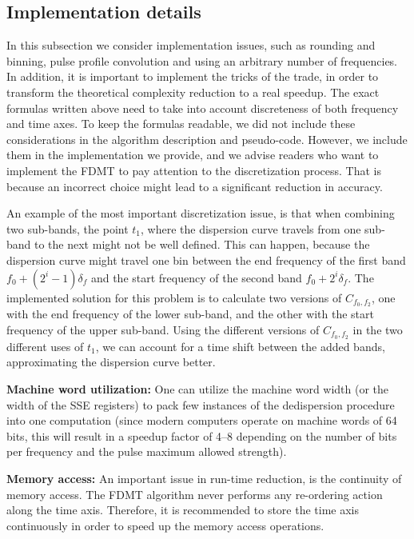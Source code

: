 \documentclass[iop]{emulateapj}
\begin{document}
\subsection{Implementation details}\label{subsec:ImplementataionDetailsFDMT}
In this subsection we consider implementation issues, such as rounding and binning, pulse profile convolution and using an arbitrary number of frequencies.
In addition, it is important to implement the tricks of the trade, in order to transform the theoretical complexity reduction to a real speedup. 
The exact formulas written above need to take into account discreteness of both frequency and time axes. To keep the formulas readable, we did not include these considerations in the algorithm description and pseudo-code. However, we include them in the implementation we provide, and we advise readers who want to implement the FDMT to pay attention to the discretization process. That is because an incorrect choice might lead to a significant reduction in accuracy.

An example of the most important discretization issue, is that when combining two sub-bands, the point $t_1$, where the dispersion curve travels from one sub-band to the next might not be well defined. This can happen, because the dispersion curve might travel one bin between the end frequency of the first band $f_0+(2^i-1)\delta_f$ and the start frequency of the second band $f_0 + 2^i\delta_f$.
The implemented solution for this problem is to calculate two versions of $C_{f_0,f_2}$, one with the end frequency of the lower sub-band, and the other with the start frequency of the upper sub-band.
Using the different versions of $C_{f_0,f_2}$ in the two different uses of $t_1$, we can account for a time shift between the added bands, approximating the dispersion curve better.

{\bf Machine word utilization:}
One can utilize the machine word width (or the width of the SSE registers) to pack few instances of the dedispersion procedure into one computation (since modern computers operate on machine words of 64 bits, this will result in a speedup factor of 4--8 depending on the number of bits per frequency and the pulse maximum allowed strength).

{\bf Memory access:}
An important issue in run-time reduction, is the continuity of memory access. The FDMT algorithm never performs any re-ordering action along the time axis.
Therefore, it is recommended to store the time axis continuously in order to speed up the memory access operations. 
\end{document}
